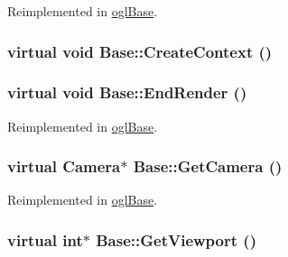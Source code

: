 Reimplemented in \hyperlink{classogl_base_a75a22cce4389543fe130f5540dd481b}{oglBase}.\hypertarget{class_base_72b306f2a2396b1520c036eae6e5054e}{
\subsubsection[{CreateContext}]{\setlength{\rightskip}{0pt plus 5cm}virtual void Base::CreateContext ()}}
\label{class_base_72b306f2a2396b1520c036eae6e5054e}


\hypertarget{class_base_18136e695927486c0487eb9224911162}{
\subsubsection[{EndRender}]{\setlength{\rightskip}{0pt plus 5cm}virtual void Base::EndRender ()}}
\label{class_base_18136e695927486c0487eb9224911162}




Reimplemented in \hyperlink{classogl_base_b631bdff58ff97debfac8de95af16f79}{oglBase}.\hypertarget{class_base_1e6c50833404c9b10a4e4451e035fe73}{
\subsubsection[{GetCamera}]{\setlength{\rightskip}{0pt plus 5cm}virtual {\bf Camera}$\ast$ Base::GetCamera ()}}
\label{class_base_1e6c50833404c9b10a4e4451e035fe73}




Reimplemented in \hyperlink{classogl_base_a102dbfe5a17fb2f2954140de4c92895}{oglBase}.\hypertarget{class_base_78a8e2e08b7c6ecbe164c49630aabd4e}{
\subsubsection[{GetViewport}]{\setlength{\rightskip}{0pt plus 5cm}virtual int$\ast$ Base::GetViewport ()}}
\label{class_base_78a8e2e08b7c6ecbe164c49630aabd4e}





